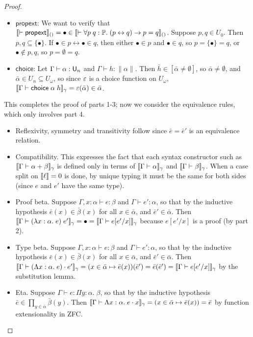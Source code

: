 \begin{proof}
\begin{itemize}
\item $\mathsf{propext}$: We want to verify that $\llbracket \vdash\mathsf{propext}\rrbracket_{()}=\bullet\in\llbracket \vdash\forall p\;q:\mathbb{P}.\;(p\leftrightarrow q)\to p=q\rrbracket_{()}$. Suppose $p,q\in U_0$. Then $p,q\subseteq\{\bullet\}$. If $\bullet\in p\leftrightarrow\bullet\in q$, then either $\bullet\in p$ and $\bullet\in q$, so $p=\{\bullet\}=q$, or $\bullet\notin p,q$, so $p=\emptyset=q$.
\item $\mathsf{choice}$: Let $\Gamma\vdash\alpha:\U_n$ and $\Gamma\vdash h:\|\alpha\|$. Then $\bar h\in[\bar\alpha\ne\emptyset]$, so $\bar\alpha\ne\emptyset$, and $\bar\alpha\in U_n\subseteq U_\omega$, so since $\varepsilon$ is a choice function on $U_\omega$, $\scott{\Gamma\vdash\mathsf{choice}\;\alpha\;h}_\gamma=\vep(\bar\alpha)\in\bar\alpha$.
\end{itemize}
This completes the proof of parts 1-3; now we consider the equivalence rules, which only involves part 4.
\begin{itemize}
\item Reflexivity, symmetry and transitivity follow since $\bar e=\bar e'$ is an equivalence relation.
\item Compatibility. This expresses the fact that each syntax constructor such as $\scott{\Gamma\vdash \alpha+\beta}_\gamma$ is defined only in terms of $\scott{\Gamma\vdash \alpha}_\gamma$ and $\scott{\Gamma\vdash\beta}_\gamma$. When a case split on $\llbracket \ell\rrbracket=0$ is done, by unique typing it must be the same for both sides (since $e$ and $e'$ have the same type).
\item Proof beta. Suppose $\Gamma,x:\alpha\vdash e:\beta$ and $\Gamma\vdash e':\alpha$, so that by the inductive hypothesis $\bar e(x)\in\bar\beta(x)$ for all $x\in\bar\alpha$, and $\bar e'\in\bar\alpha$. Then $\scott{\Gamma\vdash(\lambda x:\alpha.\;e)\;e'}_\gamma=\bullet=\scott{\Gamma\vdash e[e'/x]}_\gamma$ because $e[e'/x]$ is a proof (by part 2).
\item Type beta. Suppose $\Gamma,x:\alpha\vdash e:\beta$ and $\Gamma\vdash e':\alpha$, so that by the inductive hypothesis $\bar e(x)\in\bar\beta(x)$ for all $x\in\bar\alpha$, and $\bar e'\in\bar\alpha$. Then $\scott{\Gamma\vdash(\Lambda x:\alpha.\;e)\cdot e'}_\gamma=(x\in\bar\alpha\mapsto\bar e(x))(\bar e')=\bar e(\bar e')=\scott{\Gamma\vdash e[e'/x]}_\gamma$ by the substitution lemma.
\item Eta. Suppose $\Gamma\vdash e:\Pi y:\alpha.\;\beta$, so that by the inductive hypothesis $\bar e\in\prod_{y\in\bar\alpha}\bar\beta(y)$. Then $\scott{\Gamma\vdash \Lambda x:\alpha.\;e\cdot x}_\gamma=(x\in\bar\alpha\mapsto\bar e(x))=\bar e$ by function extensionality in ZFC.

\end{itemize}
\end{proof}
